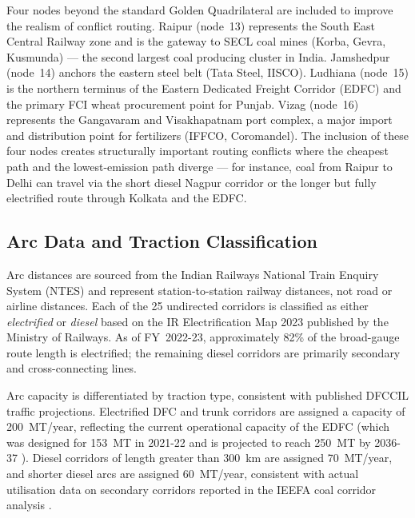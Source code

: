 \documentclass[11pt, a4paper]{article}
\numberwithin{equation}{section}
\numberwithin{figure}{section}
\numberwithin{table}{section}
\begin{document}
Four nodes beyond the standard Golden Quadrilateral are included to improve the
realism of conflict routing. Raipur (node~13) represents the South East Central Railway
zone and is the gateway to SECL coal mines (Korba, Gevra, Kusmunda) — the second
largest coal producing cluster in India. Jamshedpur (node~14) anchors the eastern steel
belt (Tata Steel, IISCO). Ludhiana (node~15) is the northern terminus of the Eastern
Dedicated Freight Corridor (EDFC) and the primary FCI wheat procurement point for
Punjab. Vizag (node~16) represents the Gangavaram and Visakhapatnam port complex, a
major import and distribution point for fertilizers (IFFCO, Coromandel). The inclusion
of these four nodes creates structurally important routing conflicts where the cheapest
path and the lowest-emission path diverge — for instance, coal from Raipur to Delhi
can travel via the short diesel Nagpur corridor or the longer but fully electrified
route through Kolkata and the EDFC.

\subsection{Arc Data and Traction Classification}

Arc distances are sourced from the Indian Railways National Train Enquiry System (NTES)
and represent station-to-station railway distances, not road or airline distances. Each
of the 25 undirected corridors is classified as either \textit{electrified} or
\textit{diesel} based on the IR Electrification Map 2023 published by the Ministry of
Railways. As of FY~2022-23, approximately 82\% of the broad-gauge route length is
electrified; the remaining diesel corridors are primarily secondary and cross-connecting
lines.

Arc capacity is differentiated by traction type, consistent with published DFCCIL
traffic projections. Electrified DFC and trunk corridors are assigned a capacity of
200~MT/year, reflecting the current operational capacity of the EDFC (which was designed
for 153~MT in 2021-22 and is projected to reach 250~MT by 2036-37 \cite{railwaygazette2023}).
Diesel corridors of length greater than 300~km are assigned 70~MT/year, and shorter
diesel arcs are assigned 60~MT/year, consistent with actual utilisation data on
secondary corridors reported in the IEEFA coal corridor analysis \cite{ieefa2023}.
\end{document}
